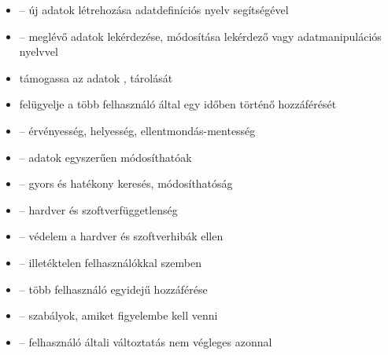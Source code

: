 \documentclass[main.tex]{subfiles}
\begin{document}
  \begin{itemize}
    \item {} – új adatok létrehozása adatdefiníciós
    nyelv segítségével
    
    \item {} – meglévő adatok lekérdezése, módosítása
    lekérdező vagy adatmanipulációs nyelvvel

    \item támogassa az adatok ,
     tárolását

    \item felügyelje a több felhasználó által egy
    időben történő hozzáférését


    \item {} \tabto{4.5cm} – \tabto{5.5cm}
    érvényesség, helyesség, ellentmondás-mentesség
    
    \item {} \tabto{4.5cm} – \tabto{5.5cm}
    adatok egyszerűen módosíthatóak
    
    \item {} \tabto{4.5cm} – \tabto{5.5cm}
    gyors és hatékony keresés, módosíthatóság
    
    \item {} \tabto{4.5cm} – \tabto{5.5cm}
    hardver és szoftverfüggetlenség
    
    \item {} \tabto{4.5cm} – \tabto{5.5cm}
    védelem a hardver és szoftverhibák ellen
    
    \item {} \tabto{4.5cm} – \tabto{5.5cm}
    illetéktelen felhasználókkal szemben
    
    \item {} \tabto{4.5cm} – \tabto{5.5cm}
    több felhasználó egyidejű hozzáférése

    \item {} \tabto{5cm} – \tabto{5.5cm}
    szabályok, amiket figyelembe kell venni

    \item {} \tabto{4.5cm} – \tabto{5.5cm}
    felhasználó általi változtatás nem végleges azonnal
  \end{itemize}
\end{document}
